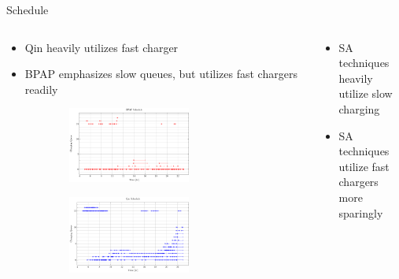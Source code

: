 \documentclass[aspectratio=169,dvipsnames]{beamer}
\begin{document}
\begin{frame}[label={sec:orgb052525}]{Schedule}
\begin{columns}
\begin{column}{0.5\columnwidth}
{\scriptsize
\begin{itemize}
\item Qin heavily utilizes fast charger
\item BPAP emphasizes slow queues, but utilizes fast chargers readily
\end{itemize}
}

\begin{figure}
\begin{subfigure}[t]{\textwidth}
\centering
    \includegraphics[width=0.7\textwidth]{img/sa-pap-paper-good/schedule-milp}
\end{subfigure}
\begin{subfigure}[t]{\textwidth}
\centering
    \includegraphics[width=0.7\textwidth]{img/sa-pap-paper-good/schedule-qin}
\end{subfigure}
\end{figure}
\end{column}

\begin{column}{0.5\columnwidth}
{\scriptsize
\begin{itemize}
\item SA techniques heavily utilize slow charging
\item SA techniques utilize fast chargers more sparingly
\end{itemize}
}


\end{column}
\end{columns}
\end{frame}
\end{document}
